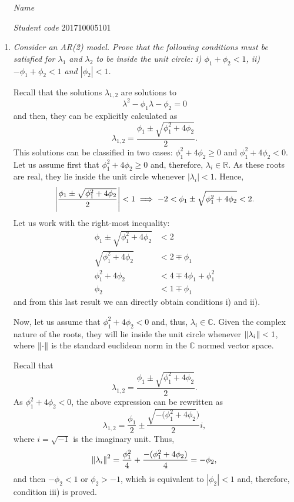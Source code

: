 \documentclass[fleqn]{article}
\let\originalleft\left
\let\originalright\right
\renewcommand{\left}{\mathopen{}\mathclose\bgroup\originalleft}
\renewcommand{\right}{\aftergroup\egroup\originalright}
\newcommand{\norm}[1]{\left\lVert#1\right\rVert}
\begin{document}
 \vspace{0.3cm}
   \begin{itemize}[leftmargin=6.25cm, labelsep=0.5cm]

     \item[\textit{Name}]  %
     \item[\textit{Student code}] 201710005101 %

   \end{itemize}
\vspace{0.3cm}

\begin{enumerate}
\item \textit{Consider an AR(2) model. Prove that the following conditions must be satisfied for $\lambda_1$ and $\lambda_2$ to be inside the unit circle: i) $\phi_1+\phi_2<1$, ii) $-\phi_1+\phi_2<1$ and $|\phi_2|<1$.}

Recall that the solutions $\lambda_{1,2}$ are solutions to 
\[
\lambda^2 - \phi_1\lambda - \phi_2=0
\]
and then, they can be explicitly calculated as
\[
\lambda_{1,2} = \dfrac{\phi_1\pm\sqrt{\phi_1^2+4\phi_2}}{2}.
\]
This solutions can be classified in two cases: $\phi_1^2+4\phi_2\geq0$ and $\phi_1^2+4\phi_2<0$. Let us assume first that $\phi_1^2+4\phi_2\geq0$ and, therefore, $\lambda_i\in\mathbb{R}$. As these roots are real, they lie inside the unit circle whenever $|\lambda_i|<1$. Hence,
\[
\left|\dfrac{\phi_1\pm\sqrt{\phi_1^2+4\phi_2}}{2}\right|<1\implies
-2<\phi_1\pm\sqrt{\phi_1^2+4\phi_2}<2.
\]
Let us work with the right-most inequality:
\[
\begin{split}
\phi_1\pm\sqrt{\phi_1^2+4\phi_2}&<2\\
\sqrt{\phi_1^2+4\phi_2}&<2\mp\phi_1\\
\phi_1^2+4\phi_2&<4\mp 4\phi_1+\phi_1^2\\
\phi_2&<1\mp\phi_1
\end{split}
\]
and from this last result we can directly obtain conditions i) and ii). 

Now, let us assume that $\phi_1^2+4\phi_2<0$ and, thus, $\lambda_i\in\mathbb{C}$. Given the complex nature of the roots, they will lie inside the unit circle whenever $\norm{\lambda_i}<1$, where $\norm{\cdot}$ is the standard euclidean norm in the $\mathbb{C}$ normed vector space.

Recall that 
\[
\lambda_{1,2} = \dfrac{\phi_1\pm\sqrt{\phi_1^2+4\phi_2}}{2}.
\]
As $\phi_1^2+4\phi_2<0$, the above expression can be rewritten as
\[
\lambda_{1,2} = \dfrac{\phi_1}{2}\pm\dfrac{\sqrt{-(\phi_1^2+4\phi_2})}{2}i,
\]
where $i=\sqrt{-1}$ is the imaginary unit. Thus,
\[
\norm{\lambda_i}^2=\dfrac{\phi_1^2}{4}+\dfrac{-(\phi_1^2+4\phi_2)}{4}=-\phi_2,
\]
and then $-\phi_2<1$ or $\phi_2>-1$, which is equivalent to $|\phi_2|<1$ and, therefore, condition iii) is proved.


\end{enumerate}
\end{document}
